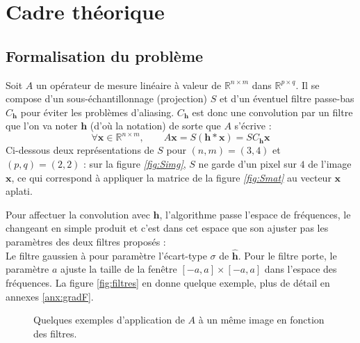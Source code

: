 \documentclass[hidelinks, french]{article} %
\newcommand{\R}{\mathbb{R}}
\renewcommand{\bf}[1]{\boldsymbol{#1}}
\theoremstyle{enonce}
\theoremstyle{special}
\theoremstyle{rq}
\theoremstyle{exo}
\theoremstyle{demo}
\begin{document}
\section{Cadre théorique}\label{sec:cadre theo}


\subsection{Formalisation du problème}\label{sec:forma2pb}

Soit $A$ un opérateur de mesure linéaire à valeur de $\R^{n\times m}$ dans $\R^{p\times q}$. Il se compose d'un sous-échantillonnage (projection) $S$ et d'un éventuel filtre passe-bas $C_{\bf{h}}$ pour éviter les problèmes d'aliasing. $C_{\bf{h}}$ est donc une convolution par un filtre que l'on va noter $\bf{h}$ (d'où la notation) de sorte que $A$ s'écrive :
\[\forall \bf{x}\in\R^{n\times m},\qquad A\bf{x}=S(\bf{h}*\bf{x})=SC_{\bf{h}}\bf{x}\]
Ci-dessous deux représentations de $S$ pour $(n,m)=(3, 4)$ et $(p,q)=(2, 2)$ : sur la figure \textit{\ref{fig:Simg}}, $S$ ne garde d'un pixel sur $4$ de l'image $\bf{x}$, ce qui correspond à appliquer la matrice de la figure \textit{\ref{fig:Smat}} au vecteur $\bf{x}$ aplati.

Pour affectuer la convolution avec $\bf{h}$, l'algorithme passe l'espace de fréquences, le changeant en simple produit et c'est dans cet espace que son ajuster pas les paramètres des deux filtres proposés :
\\
Le filtre gaussien à pour paramètre l'écart-type $\sigma$ de $\hat{\bf{h}}$. Pour le filtre porte, le paramètre $a$ ajuste la taille de la fenêtre $[-a,a]\times[-a,a]$ dans l'espace des fréquences. La figure \ref{fig:filtres} en donne quelque exemple, plus de détail en annexes \ref{anx:gradF}.
\\

\begin{figure}[b]
\begin{floatrow}
{}

{}
\end{floatrow}
\end{figure}

\begin{figure}[h]\centering
    
    \caption{Quelques exemples d'application de $A$ à un même image en fonction des filtres. }
\end{figure}
\end{document}
